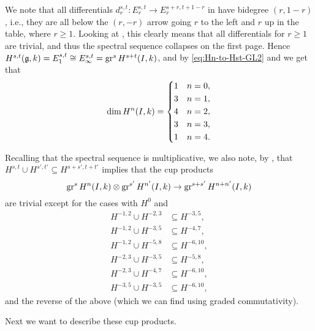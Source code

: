 We note that all differentials $d_{r}^{s,t} \colon E_{r}^{s,t} \to E_{r}^{s+r,t+1-r}$ in  have bidegree $(r,1-r)$, i.e., they are all below the $(r,-r)$ arrow going $r$ to the left and $r$ up in the table, where $r \geq 1$. Looking at , this clearly means that all differentials for $r \geq 1$ are trivial, and thus the spectral sequence collapses on the first page. Hence $H^{s,t}(\mathfrak{g},k) = E_{1}^{s,t} \cong E_{\infty}^{s,t} = \operatorname{gr}^{s} H^{s+t}(I,k)$, and by \eqref{eq:Hn-to-Hst-GL2} and  we get that
\begin{equation}
  \label{eq:dim-HnI-GL2}
  \dim H^{n}(I,k) =
  \begin{dcases}
    1 & n=0, \\
    3 & n=1, \\
    4 & n=2, \\
    3 & n=3, \\
    1 & n=4.
  \end{dcases}
\end{equation}

Recalling that the spectral sequence is multiplicative, we also note, by , that $H^{s,t} \cup H^{s',t'} \subseteq H^{s+s',t+t'}$ implies that the cup products
\begin{equation*}
  \operatorname{gr}^{s} H^{n}(I,k) \otimes \operatorname{gr}^{s'} H^{n'}(I,k) \to \operatorname{gr}^{s+s'} H^{n+n'}(I,k)
\end{equation*}
are trivial except for the cases with $H^{0}$ and
\begin{equation}\label{eq:non-triv-cups-GL2}
  \begin{aligned}
    H^{-1,2} \cup H^{-2,3} &\subseteq H^{-3,5}, \\
    H^{-1,2} \cup H^{-3,5} &\subseteq H^{-4,7}, \\
    H^{-1,2} \cup H^{-5,8} &\subseteq H^{-6,10}, \\
    H^{-2,3} \cup H^{-3,5} &\subseteq H^{-5,8}, \\
    H^{-2,3} \cup H^{-4,7} &\subseteq H^{-6,10}, \\
    H^{-3,5} \cup H^{-3,5} &\subseteq H^{-6,10},
  \end{aligned}
\end{equation}
and the reverse of the above (which we can find using graded commutativity).

Next we want to describe these cup products.

